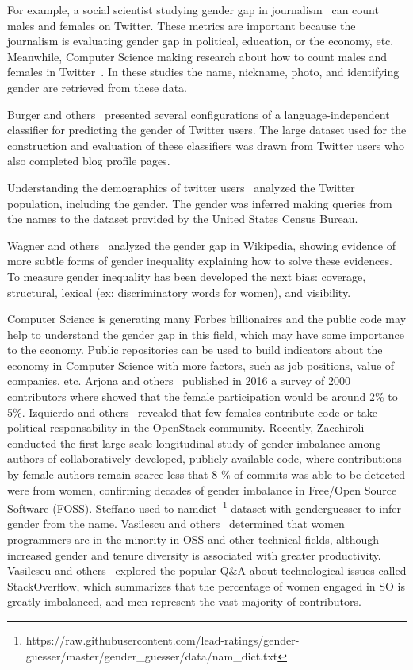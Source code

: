 \documentclass[a4paper]{article}
\begin{document}
For example, a social scientist studying gender gap in
journalism~\cite{alvarez2012journalism} can count males and
females on Twitter. These metrics are important because the journalism
is evaluating gender gap in political, education, or the economy,
etc. Meanwhile, Computer Science making research about how to
count males and females in Twitter~\cite{burger2011discriminating}. In
these studies the name, nickname, photo, and identifying gender are
retrieved from these data.

Burger and others~\cite{burger2011discriminating} presented
several configurations of a
language-independent classifier for predicting the gender of Twitter
users. The large dataset used for the construction and evaluation of
these classifiers was drawn from Twitter users who also completed blog
profile pages.

Understanding the demographics of twitter users~\cite{mislove2011understanding}
analyzed the Twitter population, including the gender. The gender
was inferred making queries from the names to the dataset provided
by the United States Census Bureau.

Wagner and others~\cite{wagner2015s} analyzed the gender gap in Wikipedia,
showing evidence of more subtle forms of gender inequality explaining
how to solve these evidences. To measure gender inequality has been
developed the next bias: coverage, structural, lexical (ex:
discriminatory words for women), and visibility.

Computer Science is generating many Forbes billionaires and the public
code may help to understand the gender gap in this field, which may
have some importance to the economy. Public repositories can
be used to build indicators about the economy in Computer Science with
more factors, such as job positions, value of companies, etc.
Arjona and others~\cite{10.1007/978-3-319-39225-7_13} published in 2016
a survey of 2000 contributors where showed that the female participation would be
around 2\% to 5\%. Izquierdo and others~\cite{izquierdo2018openstack}
revealed that few females contribute code or take political
responsability in the OpenStack community.
Recently, Zacchiroli~\cite{zacchiroli2020gender} conducted the first large-scale
longitudinal study of gender imbalance among authors of
collaboratively developed, publicly available code, where
contributions by female authors remain scarce less that 8 \% of
commits was able to be detected were from women, confirming decades of
gender imbalance in Free/Open Source Software (FOSS). Steffano used
to namdict~\footnote{https://raw.githubusercontent.com/lead-ratings/gender-guesser/master/gender\_guesser/data/nam\_dict.txt} dataset with genderguesser to infer gender from
the name. Vasilescu and others~\cite{vasilescu2015gender} determined
that women programmers are in the minority in OSS and other technical
fields, although increased gender and tenure diversity is associated
with greater productivity. Vasilescu and others~\cite{vasilescu2012gender}
explored the popular Q\&A about technological issues called
StackOverflow, which summarizes that the percentage of women engaged
in SO is greatly imbalanced, and men represent the vast majority of
contributors.
\end{document}
